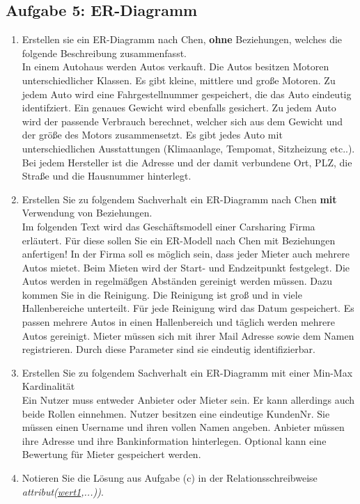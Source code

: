 \newpage
\subsection{Aufgabe 5: ER-Diagramm}
\label{sec:Aufgabe5}
\begin{enumerate}[label=\alph*)]
    \item Erstellen sie ein ER-Diagramm nach Chen, \textbf{ohne} Beziehungen, welches die
        folgende Beschreibung zusammenfasst.\\[2ex] In einem Autohaus werden Autos
        verkauft. Die Autos besitzen Motoren unterschiedlicher Klassen. Es gibt
        kleine, mittlere und große Motoren. Zu jedem Auto wird eine Fahrgestellnummer
        gespeichert, die das Auto eindeutig identifziert. Ein genaues Gewicht wird
        ebenfalls gesichert. Zu jedem Auto wird der passende Verbrauch berechnet,
        welcher sich aus dem Gewicht und der größe des Motors zusammensetzt. Es
        gibt jedes Auto mit unterschiedlichen Ausstattungen (Klimaanlage, Tempomat,
        Sitzheizung etc..). Bei jedem Hersteller ist die Adresse und der damit
        verbundene Ort, PLZ, die Straße und die Hausnummer hinterlegt.
    \item Erstellen Sie zu folgendem Sachverhalt ein ER-Diagramm nach Chen
        \textbf{mit} Verwendung von Beziehungen.\\[2ex]
        Im folgenden Text wird das Geschäftsmodell einer Carsharing Firma erläutert.
        Für diese sollen Sie ein ER-Modell nach Chen mit Beziehungen anfertigen!
        In der Firma soll es möglich sein, dass jeder Mieter auch mehrere Autos
        mietet. Beim Mieten wird der Start- und Endzeitpunkt festgelegt. Die Autos
        werden in regelmäßgen Abständen gereinigt werden müssen. Dazu kommen Sie
        in die Reinigung. Die Reinigung ist groß und in viele Hallenbereiche
        unterteilt. Für jede Reinigung wird das Datum gespeichert. Es passen
        mehrere Autos in einen Hallenbereich und täglich werden mehrere Autos
        gereinigt. Mieter müssen sich mit ihrer Mail Adresse sowie dem Namen
        registrieren. Durch diese Parameter sind sie eindeutig identifizierbar.
    \item
        Erstellen Sie zu folgendem Sachverhalt ein ER-Diagramm mit einer Min-Max
        Kardinalität\\[0.5cm]
        Ein Nutzer muss entweder Anbieter oder Mieter sein. Er kann allerdings auch
        beide Rollen einnehmen. Nutzer besitzen eine eindeutige KundenNr. Sie
        müssen einen Username und ihren vollen Namen angeben. Anbieter müssen
        ihre Adresse und ihre Bankinformation hinterlegen. Optional kann eine
        Bewertung für Mieter gespeichert werden.

    \item Notieren Sie die Lösung aus Aufgabe (c) in der Relationsschreibweise \textit{attribut(\underline{wert1},...))}.
\end{enumerate}
